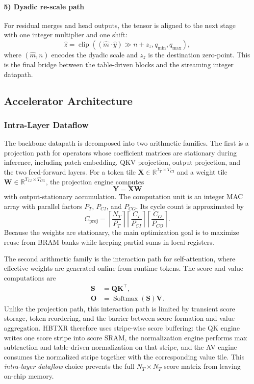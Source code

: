 \documentclass[journal]{IEEEtran}
\begin{document}
\paragraph*{5) Dyadic re-scale path}
For residual merges and head outputs, the tensor is aligned to the next stage with one integer multiplier and one shift:
\begin{equation}
\hat z = \operatorname{clip}\!\left(\left(\hat m \cdot \hat y\right)\gg n + z_z,
q_{\min},q_{\max}\right),
\end{equation}
where $(\hat m,n)$ encodes the dyadic scale and $z_z$ is the destination zero-point. This is the final bridge between the table-driven blocks and the streaming integer datapath.

\subsection{Accelerator Architecture}
\subsubsection{Intra-Layer Dataflow}
The backbone datapath is decomposed into two arithmetic families. The first is a projection path for operators whose coefficient matrices are stationary during inference, including patch embedding, QKV projection, output projection, and the two feed-forward layers. For a token tile $\mathbf X\in\mathbb R^{T_T\times T_{CI}}$ and a weight tile $\mathbf W\in\mathbb R^{T_{CI}\times T_{CO}}$, the projection engine computes
\begin{equation}
\mathbf Y = \mathbf X\mathbf W
\end{equation}
with output-stationary accumulation. The computation unit is an integer MAC array with parallel factors $P_T$, $P_{CI}$, and $P_{CO}$. Its cycle count is approximated by
\begin{equation}
C_{\mathrm{proj}}=
\left\lceil\frac{N_T}{P_T}\right\rceil
\left\lceil\frac{C_I}{P_{CI}}\right\rceil
\left\lceil\frac{C_O}{P_{CO}}\right\rceil.
\end{equation}
Because the weights are stationary, the main optimization goal is to maximize reuse from BRAM banks while keeping partial sums in local registers.

The second arithmetic family is the interaction path for self-attention, where effective weights are generated online from runtime tokens. The score and value computations are
\begin{align}
\mathbf S &= \mathbf Q\mathbf K^\top,\\
\mathbf O &= \operatorname{Softmax}(\mathbf S)\mathbf V.
\end{align}
Unlike the projection path, this interaction path is limited by transient score storage, token reordering, and the barrier between score formation and value aggregation. HBTXR therefore uses stripe-wise score buffering: the QK engine writes one score stripe into score SRAM, the normalization engine performs max subtraction and table-driven normalization on that stripe, and the AV engine consumes the normalized stripe together with the corresponding value tile. This \emph{intra-layer dataflow} choice prevents the full $N_T\times N_T$ score matrix from leaving on-chip memory.
\end{document}
